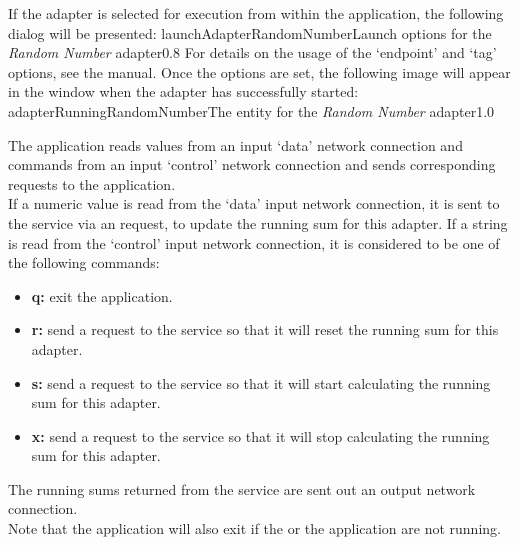 \insertStandardAdapterCommands{}
If the adapter is selected for execution from within the \emph{\MMMU} application, the
following dialog will be presented:
%
{launchAdapterRandomNumber}{Launch options for the \emph{Random Number} adapter}{0.8}
\condPage{}
For details on the usage of the `endpoint' and `tag' options, see the \emph{\MMMU} manual.
Once the options are set, the following image will appear in the \emph{\MMMU} window when
the adapter has successfully started:
%
{adapterRunningRandomNumber}{The \emph{\MMMU} entity for the \emph{Random Number}
adapter}{1.0}
\condPage
{}

The  application reads  values from an input
`data' \yarp{} network connection and commands from an input `control' \yarp{} network
connection and sends corresponding requests to the
 application.\\

If a numeric value is read from the `data' input \yarp{} network connection, it is sent to
the service via an  request, to update the
running sum for this adapter.
If a string is read from the `control' input \yarp{} network connection, it is considered
to be one of the following commands:
\begin{itemize}
\item\textbf{q:} exit the application.
\item\exSp\textbf{r:} send a  request to the
service so that it will reset the running sum for this adapter.
\item\exSp\textbf{s:} send a  request to the
service so that it will start calculating the running sum for this adapter.
\item\exSp\textbf{x:} send a  request to the
service so that it will stop calculating the running sum for this adapter.
\end{itemize}
The running sums returned from the service are sent out an output \yarp{} network
connection.\\

Note that the application will also exit if the  or the
 application are not running.\\


